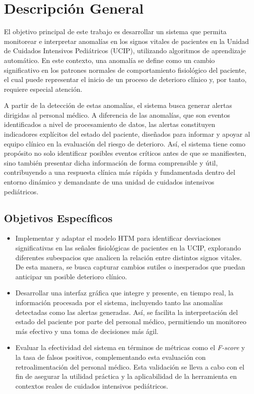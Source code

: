 \chapter{Descripción General}

El objetivo principal de este trabajo es desarrollar un sistema que permita monitorear e interpretar anomalías en los signos vitales de pacientes en la Unidad de Cuidados Intensivos Pediátricos (UCIP), utilizando algoritmos de aprendizaje automático. En este contexto, una anomalía se define como un cambio significativo en los patrones normales de comportamiento fisiológico del paciente, el cual puede representar el inicio de un proceso de deterioro clínico y, por tanto, requiere especial atención.

A partir de la detección de estas anomalías, el sistema busca generar alertas dirigidas al personal médico. A diferencia de las anomalías, que son eventos identificados a nivel de procesamiento de datos, las alertas constituyen indicadores explícitos del estado del paciente, diseñados para informar y apoyar al equipo clínico en la evaluación del riesgo de deterioro. Así, el sistema tiene como propósito no solo identificar posibles eventos críticos antes de que se manifiesten, sino también presentar dicha información de forma comprensible y útil, contribuyendo a una respuesta clínica más rápida y fundamentada dentro del entorno dinámico y demandante de una unidad de cuidados intensivos pediátricos.

\section{Objetivos Específicos}

\begin{itemize}
  \item Implementar y adaptar el modelo HTM para identificar desviaciones significativas en las señales fisiológicas de pacientes en la UCIP, explorando diferentes subespacios que analicen la relación entre distintos signos vitales. De esta manera, se busca capturar cambios sutiles o inesperados que puedan anticipar un posible deterioro clínico.

  \item  Desarrollar una interfaz gráfica que integre y presente, en tiempo real, la información procesada por el sistema, incluyendo tanto las anomalías detectadas como las alertas generadas. Así, se facilita la interpretación del estado del paciente por parte del personal médico, permitiendo un monitoreo más efectivo y una toma de decisiones más ágil.

  \item  Evaluar la efectividad del sistema en términos de métricas como el \textit{F-score} y la tasa de falsos positivos, complementando esta evaluación con retroalimentación del personal médico. Esta validación se lleva a cabo con el fin de asegurar la utilidad práctica y la aplicabilidad de la herramienta en contextos reales de cuidados intensivos pediátricos.

\end{itemize}

